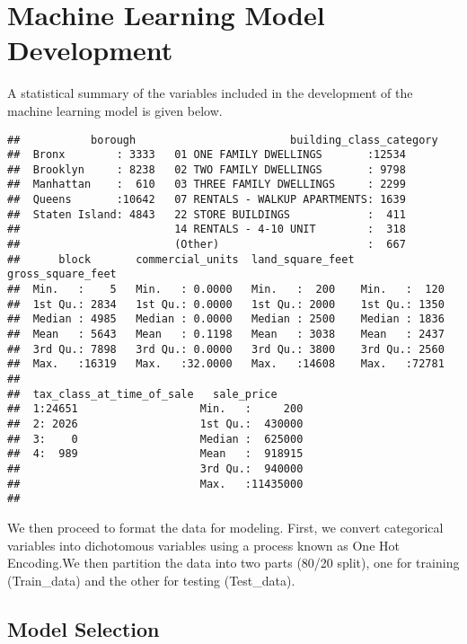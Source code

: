 \documentclass[
]{article}
\begin{document}
\section{Machine Learning Model Development}\label{machine-learning-model-development}

A statistical summary of the variables included in the development of the machine learning model is given below.

\begin{verbatim}
##           borough                        building_class_category
##  Bronx        : 3333   01 ONE FAMILY DWELLINGS       :12534     
##  Brooklyn     : 8238   02 TWO FAMILY DWELLINGS       : 9798     
##  Manhattan    :  610   03 THREE FAMILY DWELLINGS     : 2299     
##  Queens       :10642   07 RENTALS - WALKUP APARTMENTS: 1639     
##  Staten Island: 4843   22 STORE BUILDINGS            :  411     
##                        14 RENTALS - 4-10 UNIT        :  318     
##                        (Other)                       :  667     
##      block       commercial_units  land_square_feet gross_square_feet
##  Min.   :    5   Min.   : 0.0000   Min.   :  200    Min.   :  120    
##  1st Qu.: 2834   1st Qu.: 0.0000   1st Qu.: 2000    1st Qu.: 1350    
##  Median : 4985   Median : 0.0000   Median : 2500    Median : 1836    
##  Mean   : 5643   Mean   : 0.1198   Mean   : 3038    Mean   : 2437    
##  3rd Qu.: 7898   3rd Qu.: 0.0000   3rd Qu.: 3800    3rd Qu.: 2560    
##  Max.   :16319   Max.   :32.0000   Max.   :14608    Max.   :72781    
##                                                                      
##  tax_class_at_time_of_sale   sale_price      
##  1:24651                   Min.   :     200  
##  2: 2026                   1st Qu.:  430000  
##  3:    0                   Median :  625000  
##  4:  989                   Mean   :  918915  
##                            3rd Qu.:  940000  
##                            Max.   :11435000  
## 
\end{verbatim}

We then proceed to format the data for modeling. First, we convert categorical variables into dichotomous variables using a process known as One Hot Encoding.We then partition the data into two parts (80/20 split), one for training (Train\_data) and the other for testing (Test\_data).

\subsection{Model Selection}\label{model-selection}
\end{document}
